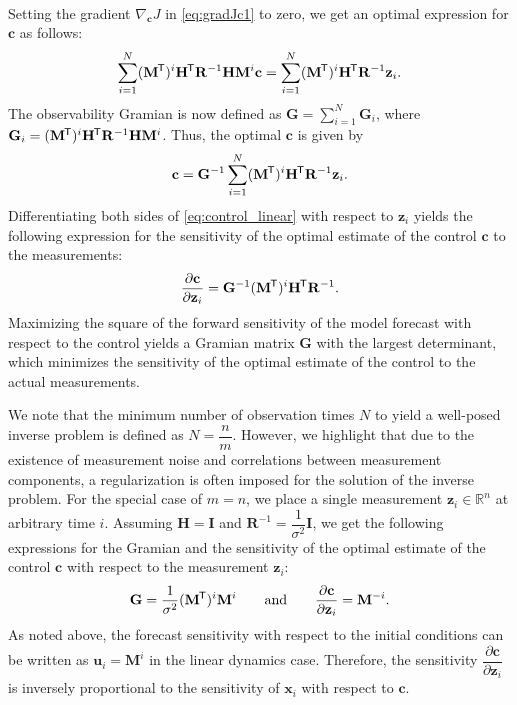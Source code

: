 \documentclass{article}
\newcommand*{\tran}{^{\mkern-1.5mu\mathsf{T}}}
\begin{document}
{\begin{align}
\end{align}
%
Setting the gradient $\nabla_{\mathbf{c}} J$ in \cref{eq:gradJc1} to zero, we get an optimal expression for $\mathbf{c}$ as follows:
\begin{equation}
    \sum_{i=1}^{N} (\mathbf{M}\tran)^i \mathbf{H}\tran \mathbf{R}^{-1} \mathbf{H} \mathbf{M}^i \mathbf{c}  = \sum_{i=1}^{N} (\mathbf{M}\tran)^i \mathbf{H}\tran \mathbf{R}^{-1} \mathbf{z}_i.
\end{equation}
The observability Gramian is now defined as $\mathbf{G} = \sum_{i=1}^{N} \mathbf{G}_i$, where $\mathbf{G}_i = (\mathbf{M}\tran)^i \mathbf{H}\tran \mathbf{R}^{-1} \mathbf{H} \mathbf{M}^i$. Thus, the optimal $\mathbf{c}$ is given by
\begin{equation}
    \mathbf{c} = \mathbf{G}^{-1} \sum_{i=1}^{N} (\mathbf{M}\tran)^i \mathbf{H}\tran \mathbf{R}^{-1} \mathbf{z}_i. \label{eq:control_linear}
\end{equation}
Differentiating both sides of \cref{eq:control_linear} with respect to $\mathbf{z}_i$ yields the following expression for the sensitivity of the optimal estimate of the control $\mathbf{c}$ to the measurements:
\begin{equation}
    \dfrac{\partial \mathbf{c}}{\partial \mathbf{z}_i} = \mathbf{G}^{-1} (\mathbf{M}\tran)^i \mathbf{H}\tran \mathbf{R}^{-1}.
\end{equation}
Maximizing the square of the forward sensitivity of the model forecast with respect to the control yields a Gramian matrix $\mathbf{G}$ with the largest determinant, which minimizes the sensitivity of the optimal estimate of the control to the actual measurements.}

\textcolor{rev}{We note that the minimum number of observation times $N$ to yield a well-posed inverse problem is defined as $N=\dfrac{n}{m}$. However, we highlight that due to the existence of measurement noise and correlations between measurement components, a regularization is often imposed for the solution of the inverse problem. For the special case of $m=n$, we place a single measurement $\mathbf{z}_i \in \mathbb{R}^n$ at arbitrary time $i$. Assuming $\mathbf{H}=\mathbf{I}$ and $\mathbf{R}^{-1}= \dfrac{1}{\sigma^2} \mathbf{I}$, we get the following expressions for the Gramian and the sensitivity of the optimal estimate of the control $\mathbf{c}$ with respect to the measurement $\mathbf{z}_i$:
\begin{align}
    \mathbf{G} = \dfrac{1}{\sigma^2} (\mathbf{M}\tran)^i \mathbf{M}^i \qquad \text{and} \qquad
    \dfrac{\partial \mathbf{c}}{\partial \mathbf{z}_i} = \mathbf{M}^{-i}.\label{eq:dcdz_linear}
\end{align}
As noted above, the forecast sensitivity with respect to the initial conditions can be written as $\mathbf{u}_i = \mathbf{M}^i$ in the linear dynamics case. Therefore, the sensitivity $\dfrac{\partial \mathbf{c}}{\partial \mathbf{z}_i}$ is inversely proportional to the sensitivity of $\mathbf{x}_i$ with respect to $\mathbf{c}$.}
\end{document}
